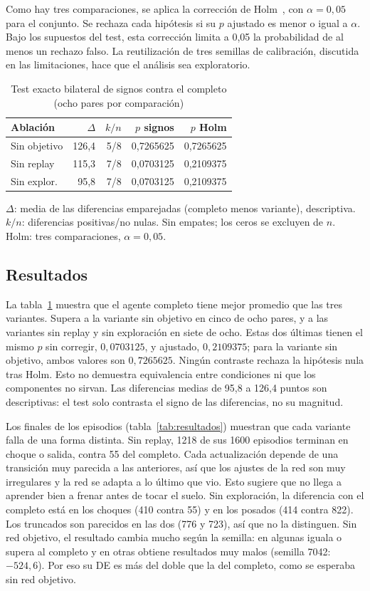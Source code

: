 \documentclass[conference]{IEEEtran}
\begin{document}
Como hay tres comparaciones, se aplica la corrección de Holm~\cite{holm1979}, con $\alpha=0{,}05$ para el conjunto. Se rechaza cada hipótesis si su $p$ ajustado es menor o igual a $\alpha$. Bajo los supuestos del test, esta corrección limita a 0,05 la probabilidad de al menos un rechazo falso. La reutilización de tres semillas de calibración, discutida en las limitaciones, hace que el análisis sea exploratorio.

\begin{table}[t]
\caption{Test exacto bilateral de signos contra el completo (ocho pares por comparación)}
\label{tab:tests}
\centering
\begin{tabular}{@{}lrrrr@{}}
\toprule
Ablación & $\Delta$ & $k/n$ & $p$ signos & $p$ Holm \\
\midrule
Sin objetivo & 126,4 & 5/8 & 0,7265625 & 0,7265625 \\
Sin replay & 115,3 & 7/8 & 0,0703125 & 0,2109375 \\
Sin explor. & 95,8 & 7/8 & 0,0703125 & 0,2109375 \\
\bottomrule
\end{tabular}
\smallskip
\parbox{\columnwidth}{\footnotesize $\Delta$: media de las diferencias emparejadas (completo menos variante), descriptiva. $k/n$: diferencias positivas/no nulas. Sin empates; los ceros se excluyen de $n$. Holm: tres comparaciones, $\alpha=0{,}05$.}
\end{table}

\subsection{Resultados}
La tabla~\ref{tab:tests} muestra que el agente completo tiene mejor promedio que las tres variantes. Supera a la variante sin objetivo en cinco de ocho pares, y a las variantes sin replay y sin exploración en siete de ocho. Estas dos últimas tienen el mismo $p$ sin corregir, $0{,}0703125$, y ajustado, $0{,}2109375$; para la variante sin objetivo, ambos valores son $0{,}7265625$. Ningún contraste rechaza la hipótesis nula tras Holm. Esto no demuestra equivalencia entre condiciones ni que los componentes no sirvan. Las diferencias medias de 95,8 a 126,4 puntos son descriptivas: el test solo contrasta el signo de las diferencias, no su magnitud.

Los finales de los episodios (tabla~\ref{tab:resultados}) muestran que cada variante falla de una forma distinta. Sin replay, 1218 de sus 1600 episodios terminan en choque o salida, contra 55 del completo. Cada actualización depende de una transición muy parecida a las anteriores, así que los ajustes de la red son muy irregulares y la red se adapta a lo último que vio. Esto sugiere que no llega a aprender bien a frenar antes de tocar el suelo. Sin exploración, la diferencia con el completo está en los choques (410 contra 55) y en los posados (414 contra 822). Los truncados son parecidos en las dos (776 y 723), así que no la distinguen. Sin red objetivo, el resultado cambia mucho según la semilla: en algunas iguala o supera al completo y en otras obtiene resultados muy malos (semilla 7042: $-524{,}6$). Por eso su DE es más del doble que la del completo, como se esperaba sin red objetivo.
\end{document}
